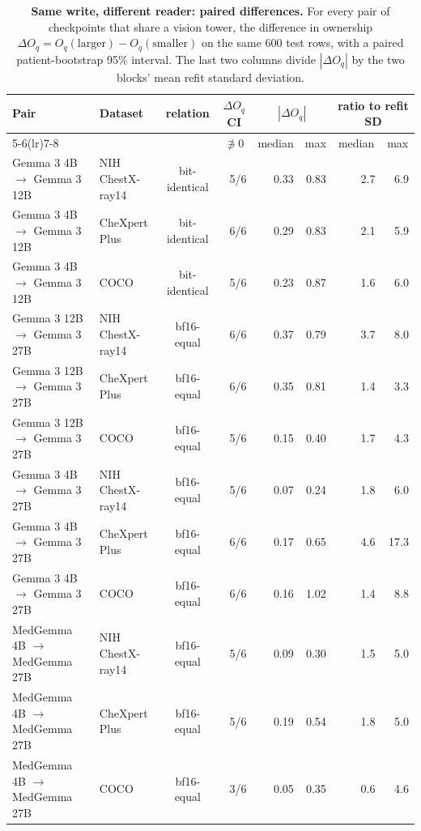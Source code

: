 \documentclass{article}
\begin{document}
\begin{table}[h]
\centering
\scriptsize
\setlength{\tabcolsep}{4pt}
\caption{\textbf{Same write, different reader: paired differences.} For every pair of checkpoints that share a vision tower, the difference in ownership $\Delta O_q=O_q(\text{larger})-O_q(\text{smaller})$ on the same 600 test rows, with a paired patient-bootstrap 95\% interval. The last two columns divide $|\Delta O_q|$ by the two blocks' mean refit standard deviation.}
\label{tab:cf-pairs}
\begin{tabular}{llcrrrrr}
\toprule
\multirow{2}{*}{Pair} & \multirow{2}{*}{Dataset} & \multirow{2}{*}{relation} & \multicolumn{1}{c}{$\Delta O_q$ CI} & \multicolumn{2}{c}{$|\Delta O_q|$} & \multicolumn{2}{c}{ratio to refit SD}\\
\cmidrule(lr){5-6}\cmidrule(lr){7-8}
&  &  & \multicolumn{1}{c}{$\not\ni 0$} & \multicolumn{1}{c}{median} & \multicolumn{1}{c}{max} & \multicolumn{1}{c}{median} & \multicolumn{1}{c}{max}\\
\midrule
Gemma 3 4B $\to$ Gemma 3 12B & NIH ChestX-ray14 & bit-identical & 5/6 & 0.33 & 0.83 & 2.7 & 6.9 \\
Gemma 3 4B $\to$ Gemma 3 12B & CheXpert Plus & bit-identical & 6/6 & 0.29 & 0.83 & 2.1 & 5.9 \\
Gemma 3 4B $\to$ Gemma 3 12B & COCO & bit-identical & 5/6 & 0.23 & 0.87 & 1.6 & 6.0 \\
Gemma 3 12B $\to$ Gemma 3 27B & NIH ChestX-ray14 & bf16-equal & 6/6 & 0.37 & 0.79 & 3.7 & 8.0 \\
Gemma 3 12B $\to$ Gemma 3 27B & CheXpert Plus & bf16-equal & 6/6 & 0.35 & 0.81 & 1.4 & 3.3 \\
Gemma 3 12B $\to$ Gemma 3 27B & COCO & bf16-equal & 5/6 & 0.15 & 0.40 & 1.7 & 4.3 \\
Gemma 3 4B $\to$ Gemma 3 27B & NIH ChestX-ray14 & bf16-equal & 5/6 & 0.07 & 0.24 & 1.8 & 6.0 \\
Gemma 3 4B $\to$ Gemma 3 27B & CheXpert Plus & bf16-equal & 6/6 & 0.17 & 0.65 & 4.6 & 17.3 \\
Gemma 3 4B $\to$ Gemma 3 27B & COCO & bf16-equal & 6/6 & 0.16 & 1.02 & 1.4 & 8.8 \\
MedGemma 4B $\to$ MedGemma 27B & NIH ChestX-ray14 & bf16-equal & 5/6 & 0.09 & 0.30 & 1.5 & 5.0 \\
MedGemma 4B $\to$ MedGemma 27B & CheXpert Plus & bf16-equal & 5/6 & 0.19 & 0.54 & 1.8 & 5.0 \\
MedGemma 4B $\to$ MedGemma 27B & COCO & bf16-equal & 3/6 & 0.05 & 0.35 & 0.6 & 4.6 \\
\bottomrule
\end{tabular}
\end{table}
\end{document}
